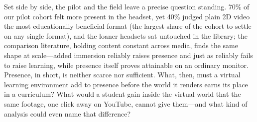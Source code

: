 Set side by side, the pilot and the field leave a precise question standing.
70\% of our pilot cohort felt more present in the headset, yet 40\% judged
plain 2D video the most educationally beneficial format (the
largest share of the cohort to settle on any single format), and the loaner
headsets sat untouched in the library; the comparison literature, holding
content constant across media, finds the same shape at scale---added immersion
reliably raises presence and just as reliably fails to raise learning, while
presence itself proves attainable on an ordinary monitor. Presence, in short, is
neither scarce nor sufficient. What, then, must a virtual learning environment
add to presence before the world it renders earns its place in a curriculum?
What would a student gain inside the virtual world that the same footage, one
click away on YouTube, cannot give them---and what kind of analysis could even
name that difference?


